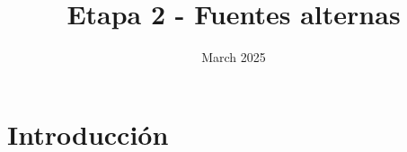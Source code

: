 \documentclass[12pt]{article}
\title{Etapa 2 - Fuentes alternas}
\date{March 2025}
\begin{document}
\maketitle



\section{Introducción}
\end{document}
